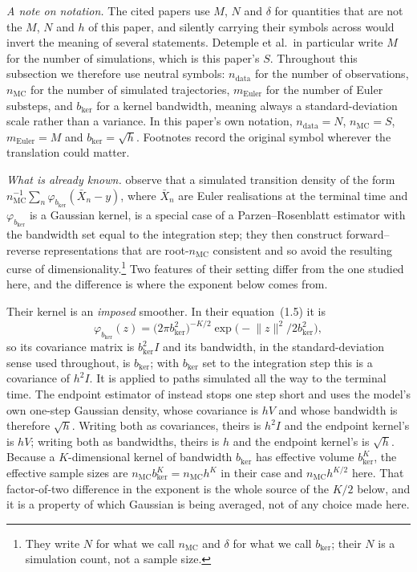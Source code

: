 \documentclass[11pt]{article}
\theoremstyle{definition}
\newcommand{\ndata}{n_{\mathrm{data}}}
\newcommand{\nmc}{n_{\mathrm{MC}}}
\newcommand{\meuler}{m_{\mathrm{Euler}}}
\newcommand{\bkernel}{b_{\mathrm{ker}}}
\begin{document}
\emph{A note on notation.} The cited papers use $M$, $N$ and $\delta$ for quantities that are not the $M$, $N$ and $h$ of this paper, and silently carrying their symbols across would invert the meaning of several statements. Detemple et al.\ in particular write $M$ for the number of simulations, which is this paper's $S$. Throughout this subsection we therefore use neutral symbols: $\ndata$ for the number of observations, $\nmc$ for the number of simulated trajectories, $\meuler$ for the number of Euler substeps, and $\bkernel$ for a kernel bandwidth, meaning always a standard-deviation scale rather than a variance. In this paper's own notation, $\ndata=N$, $\nmc=S$, $\meuler=M$ and $\bkernel=\sqrt h$. Footnotes record the original symbol wherever the translation could matter.

\emph{What is already known.} \citet[\S1, eqs.\ (1.5)--(1.7)]{MilsteinEtAl2004} observe that a simulated transition density of the form $\nmc^{-1}\sum_n\varphi_{\bkernel}(\bar X_n-y)$, where $\bar X_n$ are Euler realisations at the terminal time and $\varphi_{\bkernel}$ is a Gaussian kernel, is a special case of a Parzen--Rosenblatt estimator with the bandwidth set equal to the integration step; they then construct forward--reverse representations that are root-$\nmc$ consistent and so avoid the resulting curse of dimensionality.\footnote{They write $N$ for what we call $\nmc$ and $\delta$ for what we call $\bkernel$; their $N$ is a simulation count, not a sample size.} Two features of their setting differ from the one studied here, and the difference is where the exponent below comes from.

Their kernel is an \emph{imposed} smoother. In their equation~(1.5) it is
\[
\varphi_{\bkernel}(z)=\bigl(2\pi\bkernel^2\bigr)^{-K/2}\exp\bigl(-\lVert z\rVert^2/2\bkernel^2\bigr),
\]
so its covariance matrix is $\bkernel^2I$ and its bandwidth, in the standard-deviation sense used throughout, is $\bkernel$; with $\bkernel$ set to the integration step this is a covariance of $h^2I$. It is applied to paths simulated all the way to the terminal time. The endpoint estimator of \citet{Pedersen1995a,Pedersen1995b} instead stops one step short and uses the model's own one-step Gaussian density, whose covariance is $hV$ and whose bandwidth is therefore $\sqrt h$. Writing both as covariances, theirs is $h^2I$ and the endpoint kernel's is $hV$; writing both as bandwidths, theirs is $h$ and the endpoint kernel's is $\sqrt h$. Because a $K$-dimensional kernel of bandwidth $\bkernel$ has effective volume $\bkernel^K$, the effective sample sizes are $\nmc\bkernel^K=\nmc h^K$ in their case and $\nmc h^{K/2}$ here. That factor-of-two difference in the exponent is the whole source of the $K/2$ below, and it is a property of which Gaussian is being averaged, not of any choice made here.
\end{document}
